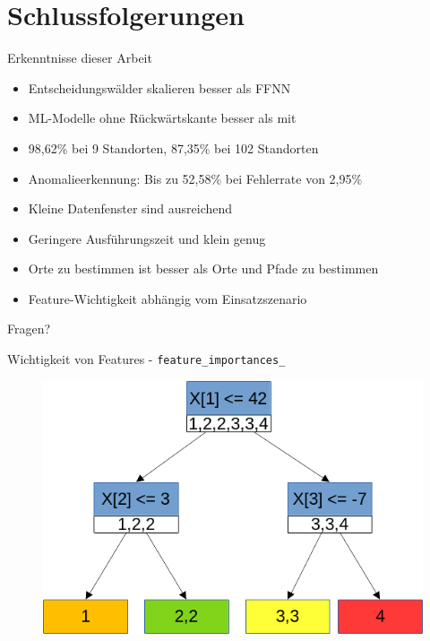 \documentclass[10pt]{beamer}
\begin{document}
\section{Schlussfolgerungen}
\begin{frame}{Erkenntnisse dieser Arbeit}
    \begin{itemize}
        \item Entscheidungswälder skalieren besser als FFNN
        \item ML-Modelle ohne Rückwärtskante besser als mit
        \item 98,62\% bei 9 Standorten, 87,35\% bei 102 Standorten
        \item Anomalieerkennung: Bis zu 52,58\% bei Fehlerrate von 2,95\%
        \item Kleine Datenfenster sind ausreichend
        \item Geringere Ausführungszeit und klein genug
        \item Orte zu bestimmen ist besser als Orte und Pfade zu bestimmen
        \item Feature-Wichtigkeit abhängig vom Einsatzszenario
    \end{itemize}
\end{frame}

\begin{frame}[standout]
  Fragen?
\end{frame}

\begin{frame}{Wichtigkeit von Features - \texttt{feature\_importances\_}}
    \begin{figure}
        \centering
        \includegraphics[width=\linewidth]{model/feature_importances.png}
    \end{figure}
\end{frame}
\end{document}
